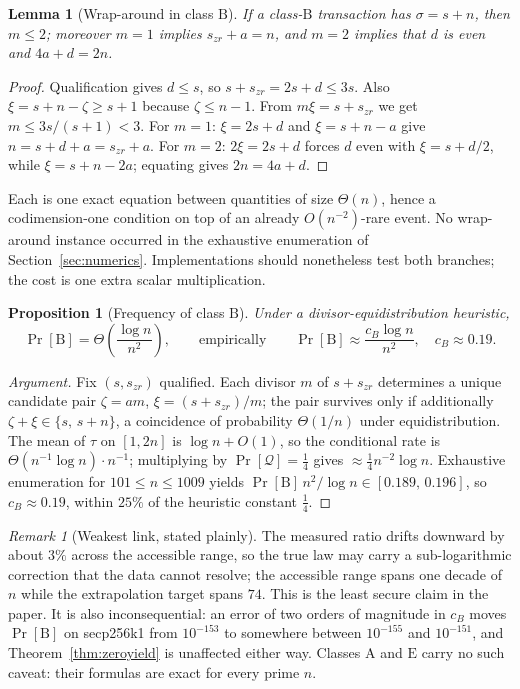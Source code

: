 \documentclass[11pt,a4paper]{article}
\theoremstyle{plain}
\newtheorem{lemma}[theorem]{Lemma}
\newtheorem{proposition}[theorem]{Proposition}
\theoremstyle{definition}
\theoremstyle{remark}
\newtheorem{remark}[theorem]{Remark}
\newcommand{\Qu}{\mathcal{Q}}
\newcommand{\Pro}{\Pr}
\newcommand{\szr}{s_{zr}}
\newcommand{\clA}{\mathrm{A}}
\newcommand{\clB}{\mathrm{B}}
\newcommand{\clE}{\mathrm{E}}
\begin{document}
\begin{lemma}[Wrap-around in class $\clB$]\label{lem:wrap}
If a class-$\clB$ transaction has $\sigma = s+n$, then $m \le 2$; moreover $m = 1$ implies
$\szr + a = n$, and $m = 2$ implies that $d$ is even and $4a + d = 2n$.
\end{lemma}

\begin{proof}
Qualification gives $d \le s$, so $s + \szr = 2s + d \le 3s$. Also
$\xi = s + n - \zeta \ge s+1$ because $\zeta \le n-1$. From $m\xi = s+\szr$ we get
$m \le 3s/(s+1) < 3$. For $m=1$: $\xi = 2s+d$ and $\xi = s+n-a$ give $n = s+d+a = \szr + a$. For
$m=2$: $2\xi = 2s+d$ forces $d$ even with $\xi = s + d/2$, while $\xi = s+n-2a$; equating gives
$2n = 4a + d$.
\end{proof}

Each is one exact equation between quantities of size $\Theta(n)$, hence a codimension-one
condition on top of an already $O(n^{-2})$-rare event. No wrap-around instance occurred in the
exhaustive enumeration of Section~\ref{sec:numerics}. Implementations should nonetheless test both
branches; the cost is one extra scalar multiplication.

\begin{proposition}[Frequency of class $\clB$]\label{prop:Bfreq}
Under a divisor-equidistribution heuristic,
\begin{equation}\label{eq:Bfreq}
  \Pro[\clB] = \Theta\!\left(\frac{\log n}{n^{2}}\right),
  \qquad\text{empirically}\qquad
  \Pro[\clB] \approx \frac{c_B \log n}{n^{2}},\quad c_B \approx 0.19 .
\end{equation}
\end{proposition}

\begin{proof}[Argument]
Fix $(s,\szr)$ qualified. Each divisor $m$ of $s+\szr$ determines a unique candidate pair
$\zeta = am$, $\xi = (s+\szr)/m$; the pair survives only if additionally
$\zeta + \xi \in \{s,\,s+n\}$, a coincidence of probability $\Theta(1/n)$ under equidistribution.
The mean of $\tau$ on $[1,2n]$ is $\log n + O(1)$, so the conditional rate is
$\Theta(n^{-1}\log n)\cdot n^{-1}$; multiplying by $\Pro[\Qu] = \tfrac14$ gives
$\approx \tfrac14 n^{-2}\log n$. Exhaustive enumeration for $101 \le n \le 1009$ yields
$\Pro[\clB]\,n^{2}/\log n \in [0.189,\,0.196]$, so $c_B \approx 0.19$, within $25\%$ of the
heuristic constant $\tfrac14$.
\end{proof}

\begin{remark}[Weakest link, stated plainly]
The measured ratio drifts downward by about $3\%$ across the accessible range, so the true law may
carry a sub-logarithmic correction that the data cannot resolve; the accessible range spans one
decade of $n$ while the extrapolation target spans $74$. This is the least secure claim in the
paper. It is also inconsequential: an error of two orders of magnitude in $c_B$ moves
$\Pro[\clB]$ on secp256k1 from $10^{-153}$ to somewhere between $10^{-155}$ and $10^{-151}$, and
Theorem~\ref{thm:zeroyield} is unaffected either way. Classes $\clA$ and $\clE$ carry no such
caveat: their formulas are exact for every prime $n$.
\end{remark}
\end{document}
